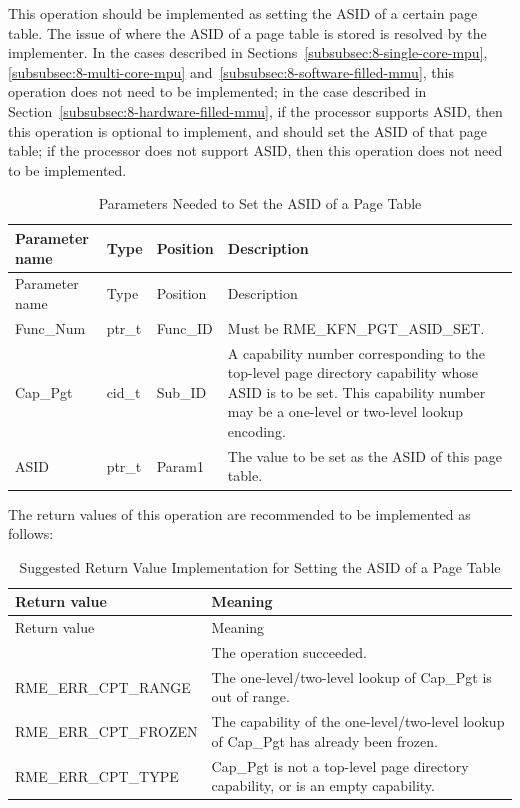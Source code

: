 This operation should be implemented as setting the ASID of a certain page table. The issue of where the ASID of a page table is stored is resolved by the implementer. In the cases described in Sections~\ref{subsubsec:8-single-core-mpu}, \ref{subsubsec:8-multi-core-mpu} and~\ref{subsubsec:8-software-filled-mmu}, this operation does not need to be implemented; in the case described in Section~\ref{subsubsec:8-hardware-filled-mmu}, if the processor supports ASID, then this operation is optional to implement, and should set the ASID of that page table; if the processor does not support ASID, then this operation does not need to be implemented.

\begin{xltabular}{\textwidth}{@{}>{\hsize\raggedright\arraybackslash}X>{\hsize\raggedright\arraybackslash}X>{\hsize\raggedright\arraybackslash}X>{\hsize\raggedright\arraybackslash}X@{}}
\caption{Parameters Needed to Set the ASID of a Page Table}\label{tab:8-9-set-page-table-asid-parameters}\\
\toprule
Parameter name & Type & Position & Description\tabularnewline
\endfirsthead
\toprule
Parameter name & Type & Position & Description\tabularnewline
\midrule
\endhead
\bottomrule
\endlastfoot
Func\_Num & ptr\_t & Func\_ID & Must be RME\_KFN\_PGT\_ASID\_SET.\tabularnewline
Cap\_Pgt & cid\_t & Sub\_ID &
A capability number corresponding to the top-level page directory capability whose ASID is to be set. This capability number may be a one-level or two-level lookup encoding.\tabularnewline
ASID & ptr\_t & Param1 & The value to be set as the ASID of this page table.\tabularnewline
\end{xltabular}
\nopagebreak[4]

The return values of this operation are recommended to be implemented as follows:

\begin{xltabular}{\textwidth}{@{}>{\hsize\raggedright\arraybackslash}X>{\hsize\raggedright\arraybackslash}X@{}}
\caption{Suggested Return Value Implementation for Setting the ASID of a Page Table}\label{tab:8-10-set-page-table-asid-suggested-return-values}\\
\toprule
Return value & Meaning\tabularnewline
\endfirsthead
\toprule
Return value & Meaning\tabularnewline
\midrule
\endhead
\bottomrule
{} & The operation succeeded.\tabularnewline
    RME\_ERR\_CPT\_RANGE & The one-level/two-level lookup of Cap\_Pgt is out of range.\tabularnewline
    RME\_ERR\_CPT\_FROZEN & The capability of the one-level/two-level lookup of Cap\_Pgt has already been frozen.\tabularnewline
    RME\_ERR\_CPT\_TYPE & Cap\_Pgt is not a top-level page directory capability, or is an empty capability.\tabularnewline
\end{xltabular}
\nopagebreak[4]

